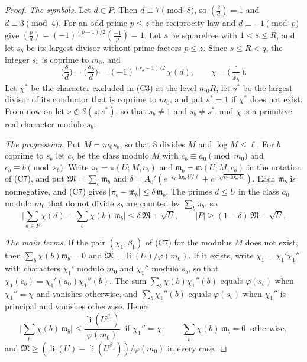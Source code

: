 \begin{proof}
\emph{The symbols.} Let $d\in P$. Then $d\equiv7\pmod8$, so $(\frac2d)=1$ and $d\equiv3\pmod4$. For an odd prime $p\le z$ the reciprocity law and $d\equiv-1\pmod p$ give $(\frac pd)=(-1)^{(p-1)/2}(\frac{-1}p)=1$. Let $s$ be squarefree with $1<s\le R$, and let $s_b$ be its largest divisor without prime factors $p\le z$. Since $s\le R<q$, the integer $s_b$ is coprime to $m_0$, and
\[
\Big(\frac sd\Big)=\Big(\frac{s_b}d\Big)=(-1)^{(s_b-1)/2}\,\chi(d),\qquad\chi=\Big(\frac{\cdot}{s_b}\Big).
\]
Let $\chi^\ast$ be the character excluded in (C3) at the level $m_0R$, let $s^\ast$ be the largest divisor of its conductor that is coprime to $m_0$, and put $s^\ast=1$ if $\chi^\ast$ does not exist. From now on let $s\notin\mathcal S(z,s^\ast)$, so that $s_b\ne1$ and $s_b\ne s^\ast$, and $\chi$ is a primitive real character modulo $s_b$.

\emph{The progression.} Put $M=m_0s_b$, so that $8$ divides $M$ and $\log M\le\ell$. For $b$ coprime to $s_b$ let $c_b$ be the class modulo $M$ with $c_b\equiv a_0\pmod{m_0}$ and $c_b\equiv b\pmod{s_b}$. Write $\pi_b=\pi(U;M,c_b)$ and $\mathfrak m_b=\mathfrak m(U;M,c_b)$ in the notation of (C7), and put $\mathfrak M=\sum_b\mathfrak m_b$ and $\delta=A_0'(e^{-c_6\log U/\ell}+e^{-\sqrt{c_6\log U}})$. Each $\mathfrak m_b$ is nonnegative, and (C7) gives $\lvert\pi_b-\mathfrak m_b\rvert\le\delta\,\mathfrak m_b$. The primes $d\le U$ in the class $a_0$ modulo $m_0$ that do not divide $s_b$ are counted by $\sum_b\pi_b$, so
\begin{equation}\label{st2a}
\Big\lvert\sum_{d\in P}\chi(d)-\sum_b\chi(b)\,\mathfrak m_b\Big\rvert\le\delta\,\mathfrak M+\sqrt U,\qquad\lvert P\rvert\ge(1-\delta)\,\mathfrak M-\sqrt U .
\end{equation}

\emph{The main terms.} If the pair $(\chi_1,\beta_1)$ of (C7) for the modulus $M$ does not exist, then $\sum_b\chi(b)\mathfrak m_b=0$ and $\mathfrak M=\operatorname{li}(U)/\varphi(m_0)$. If it exists, write $\chi_1=\chi_1'\chi_1''$ with characters $\chi_1'$ modulo $m_0$ and $\chi_1''$ modulo $s_b$, so that $\chi_1(c_b)=\chi_1'(a_0)\chi_1''(b)$. The sum $\sum_b\chi(b)\chi_1''(b)$ equals $\varphi(s_b)$ when $\chi_1''=\chi$ and vanishes otherwise, and $\sum_b\chi_1''(b)$ equals $\varphi(s_b)$ when $\chi_1''$ is principal and vanishes otherwise. Hence
\begin{equation}\label{st2b}
\Big\lvert\sum_b\chi(b)\,\mathfrak m_b\Big\rvert\le\frac{\operatorname{li}(U^{\beta_1})}{\varphi(m_0)}\ \text{ if }\chi_1''=\chi,\qquad\sum_b\chi(b)\,\mathfrak m_b=0\ \text{ otherwise},
\end{equation}
and $\mathfrak M\ge(\operatorname{li}(U)-\operatorname{li}(U^{\beta_1}))/\varphi(m_0)$ in every case.


\end{proof}
